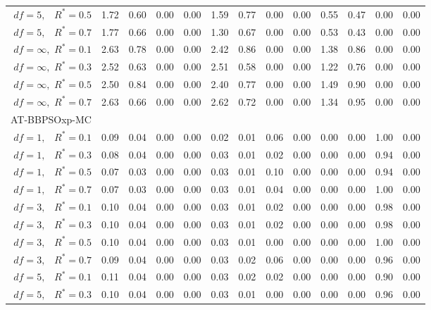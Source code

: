 \documentclass[12pt]{article}
\begin{document}
\begin{table}[ht]
{\begin{tabular}{r|rrrr|rrrr|rrrr}
  $df = 5,\enspace$ $R^* =0.5$ & 1.72 & 0.60 & 0.00 & 0.00 & 1.59 & 0.77 & 0.00 & 0.00 & 0.55 & 0.47 & 0.00 & 0.00 \\ 
  $df = 5,\enspace$ $R^* =0.7$ & 1.77 & 0.66 & 0.00 & 0.00 & 1.30 & 0.67 & 0.00 & 0.00 & 0.53 & 0.43 & 0.00 & 0.00 \\ 
  $df = \infty,$ $R^* =0.1$ & 2.63 & 0.78 & 0.00 & 0.00 & 2.42 & 0.86 & 0.00 & 0.00 & 1.38 & 0.86 & 0.00 & 0.00 \\ 
  $df = \infty,$ $R^* =0.3$ & 2.52 & 0.63 & 0.00 & 0.00 & 2.51 & 0.58 & 0.00 & 0.00 & 1.22 & 0.76 & 0.00 & 0.00 \\ 
  $df = \infty,$ $R^* =0.5$ & 2.50 & 0.84 & 0.00 & 0.00 & 2.40 & 0.77 & 0.00 & 0.00 & 1.49 & 0.90 & 0.00 & 0.00 \\ 
  $df = \infty,$ $R^* =0.7$ & 2.63 & 0.66 & 0.00 & 0.00 & 2.62 & 0.72 & 0.00 & 0.00 & 1.34 & 0.95 & 0.00 & 0.00 \\ 
\hline
\multicolumn{1}{l|}{AT-BBPSOxp-MC} &&&&&&&&&&&&\\
  $df = 1,\enspace$ $R^* =0.1$ & 0.09 & 0.04 & 0.00 & 0.00 & 0.02 & 0.01 & 0.06 & 0.00 & 0.00 & 0.00 & 1.00 & 0.00 \\ 
  $df = 1,\enspace$ $R^* =0.3$ & 0.08 & 0.04 & 0.00 & 0.00 & 0.03 & 0.01 & 0.02 & 0.00 & 0.00 & 0.00 & 0.94 & 0.00 \\ 
  $df = 1,\enspace$ $R^* =0.5$ & 0.07 & 0.03 & 0.00 & 0.00 & 0.03 & 0.01 & 0.10 & 0.00 & 0.00 & 0.00 & 0.94 & 0.00 \\ 
  $df = 1,\enspace$ $R^* =0.7$ & 0.07 & 0.03 & 0.00 & 0.00 & 0.03 & 0.01 & 0.04 & 0.00 & 0.00 & 0.00 & 1.00 & 0.00 \\ 
  $df = 3,\enspace$ $R^* =0.1$ & 0.10 & 0.04 & 0.00 & 0.00 & 0.03 & 0.01 & 0.02 & 0.00 & 0.00 & 0.00 & 0.98 & 0.00 \\ 
  $df = 3,\enspace$ $R^* =0.3$ & 0.10 & 0.04 & 0.00 & 0.00 & 0.03 & 0.01 & 0.02 & 0.00 & 0.00 & 0.00 & 0.98 & 0.00 \\ 
  $df = 3,\enspace$ $R^* =0.5$ & 0.10 & 0.04 & 0.00 & 0.00 & 0.03 & 0.01 & 0.00 & 0.00 & 0.00 & 0.00 & 1.00 & 0.00 \\ 
  $df = 3,\enspace$ $R^* =0.7$ & 0.09 & 0.04 & 0.00 & 0.00 & 0.03 & 0.02 & 0.06 & 0.00 & 0.00 & 0.00 & 0.96 & 0.00 \\ 
  $df = 5,\enspace$ $R^* =0.1$ & 0.11 & 0.04 & 0.00 & 0.00 & 0.03 & 0.02 & 0.02 & 0.00 & 0.00 & 0.00 & 0.90 & 0.00 \\ 
  $df = 5,\enspace$ $R^* =0.3$ & 0.10 & 0.04 & 0.00 & 0.00 & 0.03 & 0.01 & 0.00 & 0.00 & 0.00 & 0.00 & 0.96 & 0.00 \\ 

\end{tabular}}
\end{table}
\end{document}
